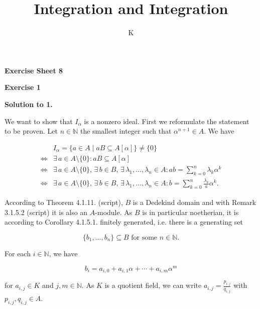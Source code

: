 \documentclass[a4paper]{article}
\title{Integration and Integration}
\author{K}
\theoremstyle{definition}
\begin{document}
\begin{center}
    \noindent\textbf{Exercise Sheet 8}
\end{center}
\noindent\textbf{Exercise 1}

\noindent\textbf{Solution to 1.}

\noindent We want to show that \(I_\alpha\) is a nonzero ideal. First we reformulate the statement to be proven. Let \(n \in \mathbb{N}\) the smallest integer such that \(\alpha^{n + 1} \in A\). We have

\begin{align}
    & I_\alpha = \{a \in A \mid aB \subseteq A[\alpha]\} \neq \{0\} \\
    \iff & \exists \, a \in A \setminus \{0\} : aB \subseteq A[\alpha] \\
    \iff & \exists \, a \in A \setminus \{0\}, \, \exists \, b \in B, \, \exists \, \lambda_1, \ldots, \lambda_n \in A : a b = \sum_{k=0}^n \lambda_k \alpha^k \\
    \iff & \exists \, a \in A \setminus \{0\}, \, \exists \, b \in B, \, \exists \, \lambda_1, \ldots, \lambda_n \in A : b = \sum_{k=0}^n \frac{\lambda_k}{a} \alpha^k \text{.}
\end{align}

According to Theorem 4.1.11. (script), \(B\) is a Dedekind domain and with Remark 3.1.5.2 (script) it is also an \(A\)-module. As \(B\) is in particular noetherian, it is according to Corollary 4.1.5.1. finitely generated, i.e. there is a generating set

\begin{equation}
    \{b_1, \ldots, b_n\} \subseteq B \text{ for some \(n \in \mathbb{N}\).}
\end{equation}

For each \(i \in \mathbb{N}\), we have

\begin{equation}
    b_i = a_{i, 0} + a_{i, 1} \alpha + \cdots + a_{i, m} \alpha^m
\end{equation}

for \(a_{i, j} \in K\) and \(j, m \in \mathbb{N}\). As \(K\) is a quotient field, we can write \(a_{i,j} = \frac{p_{i,j}}{q_{i,j}}\) with \(p_{i,j}, q_{i,j} \in A\).
\end{document}
